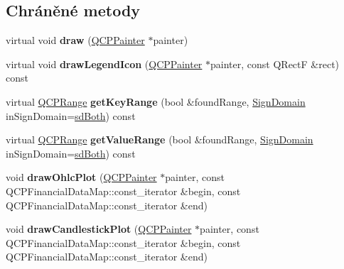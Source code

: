 \subsection*{Chráněné metody}
\begin{DoxyCompactItemize}
\item 
\hypertarget{classQCPFinancial_ad71a59a1b42616594831e04e52c92120}{}virtual void {\bfseries draw} (\hyperlink{classQCPPainter}{Q\+C\+P\+Painter} $\ast$painter)\label{classQCPFinancial_ad71a59a1b42616594831e04e52c92120}

\item 
\hypertarget{classQCPFinancial_aca85e8435b092cc8c3e5de65fcfb22c8}{}virtual void {\bfseries draw\+Legend\+Icon} (\hyperlink{classQCPPainter}{Q\+C\+P\+Painter} $\ast$painter, const Q\+Rect\+F \&rect) const \label{classQCPFinancial_aca85e8435b092cc8c3e5de65fcfb22c8}

\item 
\hypertarget{classQCPFinancial_acc747f4a9b4fddfb14eb9d803349a534}{}virtual \hyperlink{classQCPRange}{Q\+C\+P\+Range} {\bfseries get\+Key\+Range} (bool \&found\+Range, \hyperlink{classQCPAbstractPlottable_a661743478a1d3c09d28ec2711d7653d8}{Sign\+Domain} in\+Sign\+Domain=\hyperlink{classQCPAbstractPlottable_a661743478a1d3c09d28ec2711d7653d8a082b98cfb91a7363a3b5cd17b0c1cd60}{sd\+Both}) const \label{classQCPFinancial_acc747f4a9b4fddfb14eb9d803349a534}

\item 
\hypertarget{classQCPFinancial_ab2b5f3ef9a503ba32ead32081333f4e7}{}virtual \hyperlink{classQCPRange}{Q\+C\+P\+Range} {\bfseries get\+Value\+Range} (bool \&found\+Range, \hyperlink{classQCPAbstractPlottable_a661743478a1d3c09d28ec2711d7653d8}{Sign\+Domain} in\+Sign\+Domain=\hyperlink{classQCPAbstractPlottable_a661743478a1d3c09d28ec2711d7653d8a082b98cfb91a7363a3b5cd17b0c1cd60}{sd\+Both}) const \label{classQCPFinancial_ab2b5f3ef9a503ba32ead32081333f4e7}

\item 
\hypertarget{classQCPFinancial_a3c3007a7434e29d042c77ccf4f497e66}{}void {\bfseries draw\+Ohlc\+Plot} (\hyperlink{classQCPPainter}{Q\+C\+P\+Painter} $\ast$painter, const Q\+C\+P\+Financial\+Data\+Map\+::const\+\_\+iterator \&begin, const Q\+C\+P\+Financial\+Data\+Map\+::const\+\_\+iterator \&end)\label{classQCPFinancial_a3c3007a7434e29d042c77ccf4f497e66}

\item 
\hypertarget{classQCPFinancial_a71f5081da0e5ab9c40a488ad40cff122}{}void {\bfseries draw\+Candlestick\+Plot} (\hyperlink{classQCPPainter}{Q\+C\+P\+Painter} $\ast$painter, const Q\+C\+P\+Financial\+Data\+Map\+::const\+\_\+iterator \&begin, const Q\+C\+P\+Financial\+Data\+Map\+::const\+\_\+iterator \&end)\label{classQCPFinancial_a71f5081da0e5ab9c40a488ad40cff122}


\end{DoxyCompactItemize}
